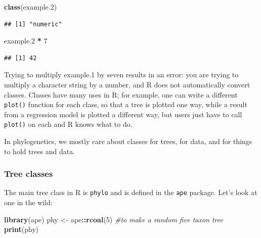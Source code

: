 \documentclass[
]{article}
\newenvironment{Shaded}{\begin{snugshade}}{\end{snugshade}}
\newcommand{\CommentTok}[1]{\textcolor[rgb]{0.56,0.35,0.01}{\textit{#1}}}
\newcommand{\DecValTok}[1]{\textcolor[rgb]{0.00,0.00,0.81}{#1}}
\newcommand{\FloatTok}[1]{\textcolor[rgb]{0.00,0.00,0.81}{#1}}
\newcommand{\KeywordTok}[1]{\textcolor[rgb]{0.13,0.29,0.53}{\textbf{#1}}}
\newcommand{\NormalTok}[1]{#1}
\newcommand{\OperatorTok}[1]{\textcolor[rgb]{0.81,0.36,0.00}{\textbf{#1}}}
\newcommand{\StringTok}[1]{\textcolor[rgb]{0.31,0.60,0.02}{#1}}
\begin{document}
\begin{Shaded}
\begin{Highlighting}[]
\KeywordTok{class}\NormalTok{(example}\FloatTok{.2}\NormalTok{)}
\end{Highlighting}
\end{Shaded}

\begin{verbatim}
## [1] "numeric"
\end{verbatim}

\begin{Shaded}
\begin{Highlighting}[]
\NormalTok{example}\FloatTok{.2} \OperatorTok{*}\StringTok{ }\DecValTok{7}
\end{Highlighting}
\end{Shaded}

\begin{verbatim}
## [1] 42
\end{verbatim}

Trying to multiply example.1 by seven results in an error: you are trying to multiply a character string by a number, and R does not automatically convert classes. Classes have many uses in R; for example, one can write a different \texttt{plot()} function for each class, so that a tree is plotted one way, while a result from a regression model is plotted a different way, but users just have to call \texttt{plot()} on each and R knows what to do.

In phylogenetics, we mostly care about classes for trees, for data, and for things to hold trees and data.

\hypertarget{tree-classes}{%
\subsubsection{Tree classes}\label{tree-classes}}

The main tree class in R is \texttt{phylo} and is defined in the \texttt{ape} package. Let's look at one in the wild:

\begin{Shaded}
\begin{Highlighting}[]
\KeywordTok{library}\NormalTok{(ape)}
\NormalTok{phy <{-}}\StringTok{ }\NormalTok{ape}\OperatorTok{::}\KeywordTok{rcoal}\NormalTok{(}\DecValTok{5}\NormalTok{) }\CommentTok{\#to make a random five taxon tree}
\KeywordTok{print}\NormalTok{(phy)}
\end{Highlighting}
\end{Shaded}
\end{document}
